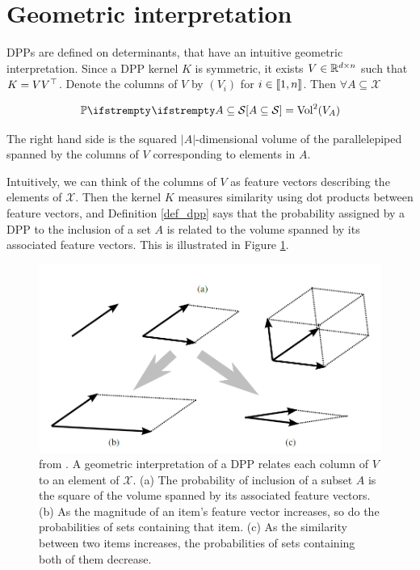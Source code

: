 \section{Geometric interpretation}
DPPs are defined on determinants, that have an intuitive geometric interpretation. Since a DPP kernel $K$ is symmetric, it exists $V \in \mathbb{R}^{d \times n}$ such that $K= V V^\top$. 
Denote the columns of $V$ by $(V_i)$ for $i\in \llbracket 1,n \rrbracket$. Then $\forall A \subseteq \mathcal{X}$

\begin{equation}
    \PP{}{A \subseteq \mathcal{S}} = \operatorname{Vol}^2(V_A)
\end{equation}

The right hand side is the squared $|A|$-dimensional volume of the parallelepiped
spanned by the columns of $V$ corresponding to elements in $A$.

Intuitively, we can think of the columns of $V$ as feature vectors describing the elements
of $\mathcal{X}$. Then the kernel $K$ measures similarity using dot products between feature vectors, and Definition \ref{def_dpp} says that the probability assigned by a DPP to the inclusion of a set $A$ is related to the volume spanned by its associated feature vectors. This is illustrated in Figure \ref{fig_geometric_interpret}.

\begin{figure}[!ht]
    \centering
    \includegraphics[width=0.8\linewidth]{pics/geometric_interpret.png}
    \caption{from \cite{kulesza2012_dpp_for_ml}. A geometric interpretation of a DPP relates each column of $V$ to an element of $\mathcal{X}$. (a) The  probability of inclusion of a subset $A$ is the square of the volume spanned by its associated feature vectors. (b) As the magnitude of an item's feature vector increases, so do the probabilities of sets containing that item. (c) As the similarity between two items increases, the probabilities of sets containing both of them decrease.}
    \label{fig_geometric_interpret}
\end{figure}

